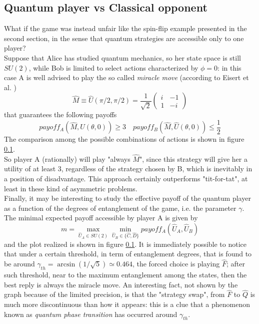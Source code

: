 \subsection{Quantum player vs Classical opponent}
What if the game was instead unfair like the spin-flip example presented in the second section, in the sense that quantum strategies are accessible only to one player?\\
Suppose that Alice has studied quantum mechanics, so her state space is still $SU(2)$, while Bob is limited to select actions characterized by $\phi=0$: in this case A is well advised to play the so called \textit{miracle move} (according to Eisert et al. \cite{Eisert_2020})
\[ \hat{M}\equiv\hat{U}(\pi/2,\pi/2)=\frac{1}{\sqrt{2}}\begin{pmatrix} i&-1\\1&-i \end{pmatrix}  \]
that guarantees the following payoffs
\[ payoff_A\left(\hat{M},\hat{U}(\theta,0)\right) \geq 3 \quad payoff_B\left(\hat{M},\hat{U}(\theta,0)\right) \leq \frac{1}{2}  \]
The comparison among the possible combinations of actions is shown in figure \ref{}.\\
So player A (rationally) will play "always $\hat{M}$", since this strategy will give her a utility of at least 3, regardless of the strategy chosen by B, which is inevitably in a position of disadvantage. This approach certainly outperforms "tit-for-tat", at least in these kind of asymmetric problems.\\
Finally, it may be interesting to study the effective payoff of the quantum player as a function of the degrees of entanglement of the game, i.e. the parameter $\gamma$. The minimal expected payoff accessible by player A is given by
\[ m = \max_{\hat{U}_A\in SU(2)}\min_{\hat{U}_B\in\{\hat{C},\hat{D}\}} payoff_A\left(\hat{U}_A, \hat{U}_B\right) \]
and the plot realized is shown in figure \ref{}. It is immediately possible to notice that under a certain threshold, in term of entanglement degrees, that is found to be around $\gamma_{th} = \arcsin\left(1/\sqrt{5}\right)\simeq 0.464$, the forced choice is playing $\hat{F}$; after such threshold, near to the maximum entanglement among the states, then the best reply is always the miracle move. An interesting fact, not shown by the graph because of the limited precision, is that the "strategy swap", from $\hat{F}$ to $\hat{Q}$ is much more discontinuous than how it appears: this is a clue that a phenomenon known as \textit{quantum phase transition} has occurred around $\gamma_{th}$.	





